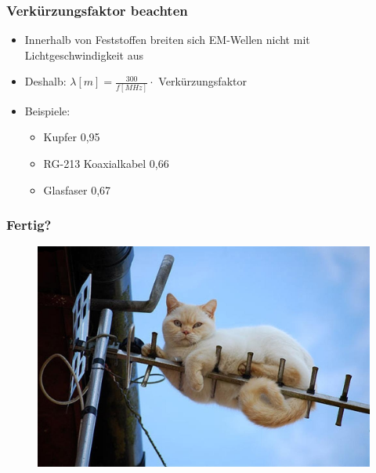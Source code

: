 \begin{frame}
  \frametitle{Verkürzungsfaktor beachten}
  \begin{center}
    \begin{itemize} \Large
      \item Innerhalb von Feststoffen breiten sich EM-Wellen nicht mit Lichtgeschwindigkeit aus
      \item Deshalb: $\lambda[m] = \frac{300}{f[MHz]} \cdot $ Verkürzungsfaktor
      \item Beispiele:
      \begin{itemize}
        \item Kupfer 0,95
        \item RG-213 Koaxialkabel 0,66
        \item Glasfaser 0,67
      \end{itemize}
    \end{itemize}
  \end{center}
\end{frame}

\begin{frame}
  \frametitle{Fertig?}
  \begin{center}
    \begin{figure}
      \includegraphics[width=.8\textwidth,height=.75\textheight,keepaspectratio]{e11/cat-antenna.jpg}
    \end{figure}
  \end{center}
\end{frame}

